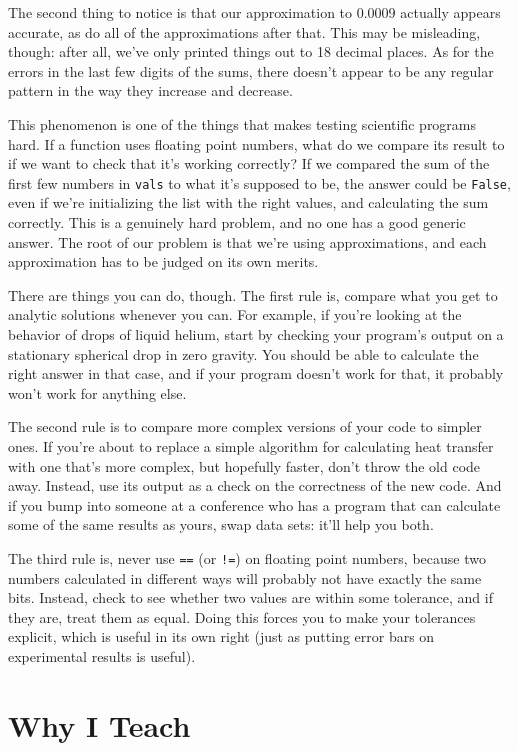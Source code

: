 \documentclass[]{book}
\begin{document}
The second thing to notice is that our approximation to 0.0009 actually
appears accurate, as do all of the approximations after that. This may
be misleading, though: after all, we've only printed things out to 18
decimal places. As for the errors in the last few digits of the sums,
there doesn't appear to be any regular pattern in the way they increase
and decrease.

This phenomenon is one of the things that makes testing scientific
programs hard. If a function uses floating point numbers, what do we
compare its result to if we want to check that it's working correctly?
If we compared the sum of the first few numbers in \texttt{vals} to what
it's supposed to be, the answer could be \texttt{False}, even if we're
initializing the list with the right values, and calculating the sum
correctly. This is a genuinely hard problem, and no one has a good
generic answer. The root of our problem is that we're using
approximations, and each approximation has to be judged on its own
merits.

There are things you can do, though. The first rule is, compare what you
get to analytic solutions whenever you can. For example, if you're
looking at the behavior of drops of liquid helium, start by checking
your program's output on a stationary spherical drop in zero gravity.
You should be able to calculate the right answer in that case, and if
your program doesn't work for that, it probably won't work for anything
else.

The second rule is to compare more complex versions of your code to
simpler ones. If you're about to replace a simple algorithm for
calculating heat transfer with one that's more complex, but hopefully
faster, don't throw the old code away. Instead, use its output as a
check on the correctness of the new code. And if you bump into someone
at a conference who has a program that can calculate some of the same
results as yours, swap data sets: it'll help you both.

The third rule is, never use \texttt{==} (or \texttt{!=}) on floating
point numbers, because two numbers calculated in different ways will
probably not have exactly the same bits. Instead, check to see whether
two values are within some tolerance, and if they are, treat them as
equal. Doing this forces you to make your tolerances explicit, which is
useful in its own right (just as putting error bars on experimental
results is useful).

\section{Why I Teach}
\end{document}
